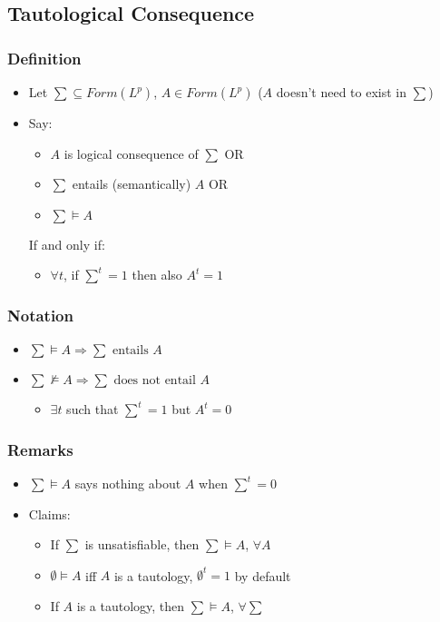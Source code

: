\documentclass[11pt]{article}
\begin{document}
\subsection{Tautological Consequence}
\subsubsection{Definition}
\begin{itemize}
    \item Let ${\sum}\subseteq Form(L^p)$, $A\in Form(L^p)$ ($A$ doesn't need to exist in $\sum$)
    \item Say: 
    \begin{itemize}
        \item $A$ is logical consequence of $\sum$ OR 
        \item $\sum$ entails (semantically) $A$ OR 
        \item ${\sum}\vDash A$
    \end{itemize}
    If and only if: 
    \begin{itemize}
        \item $\forall t$, if ${\sum}^t = 1$ then also $A^t = 1$
    \end{itemize}
\end{itemize}
\subsubsection{Notation}
\begin{itemize}
    \item ${\sum}\vDash A \Rightarrow {\sum} \text{ entails } A$
    \item ${\sum}\nvDash A \Rightarrow {\sum} \text{ does not entail } A$
    \begin{itemize}
        \item $\exists t$ such that ${\sum}^t = 1$ but $A^t = 0$
    \end{itemize}
\end{itemize}
\subsubsection{Remarks}
\begin{itemize}
    \item ${\sum}\vDash A$ says nothing about $A$ when ${\sum}^t = 0$
    \item Claims:
    \begin{itemize}
        \item If $\sum$ is unsatisfiable, then ${\sum}\vDash A$, $\forall A$
        \item $\emptyset\vDash A$ iff $A$ is a tautology, $\emptyset^t = 1$ by default
        \item If $A$ is a tautology, then ${\sum}\vDash A$, $\forall\sum$
    \end{itemize}
\end{itemize}
\begin{minipage}[t]{\linewidth}
\end{minipage}
\end{document}
